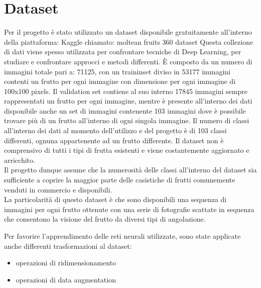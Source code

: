 \section{Dataset}
Per il progetto è stato utilizzato un dataset disponibile gratuitamente all'interno della piattaforma: Kaggle chiamato: moltean fruits 360 dataset \cite{dataset}
Questa collezione di dati viene spesso utilizzata per confrontare tecniche di Deep Learning, per studiare e confrontare approcci e metodi differenti.
È composto da un numero di immagini totale pari a: 71125, con un traininset diviso in 53177 immagini contenti un frutto per ogni immagine con dimensione per ogni immagine di 100x100 pixels.  
Il validation set contiene al suo interno 17845 immagini sempre rappresentati un frutto per ogni immagine, mentre è presente all'interno dei dati disponibile anche un set di immagini contenente 103 immagini dove è possibile trovare più di un frutto all'interno di ogni singola immagine.  
Il numero di classi all'interno dei dati al momento dell'utilizzo e del progetto è di 103 classi differenti, ognuna appartenente ad un frutto differente.  
Il dataset non è comprensivo di tutti i tipi di frutta esistenti e viene costantemente aggiornato e arricchito. \\
Il progetto dunque assume che la numerosità delle classi all'interno del dataset sia sufficiente a coprire la maggior parte delle casistiche di frutti comunemente venduti in commercio e disponibili.  \\
La particolarità di questo dataset è che sono disponibili una sequenza di immagini per ogni frutto ottenute con una serie di fotografie scattate in sequenza che consentono la visione del frutto da diversi tipi di angolazione.  
  
 Per favorire l'apprendimento delle reti neurali utilizzate, sono state applicate anche differenti trasformazioni al dataset:
 
\begin{itemize}
\item operazioni di ridimensionamento 
\item operazioni di data augmentation
\end{itemize}

